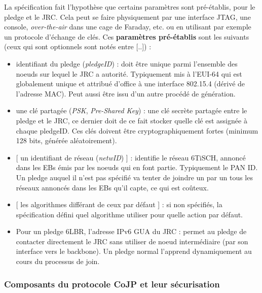 \documentclass[]{report}
\begin{document}
La spécification \cite{ietf-6tisch-minimal-security-15} fait l'hypothèse que certains paramètres sont pré-établis, pour le pledge et le JRC. Cela peut se faire physiquement par une interface JTAG, une console, \textit{over-the-air} dans une cage de Faraday, etc. ou en utilisant par exemple un protocole d'échange de clés. Ces \textbf{paramètres pré-établis} sont les suivants (ceux qui sont optionnels sont notés entre [..]) :
\vspace{0.2cm}
\begin{itemize}[label=$\bullet$]
\item identifiant du pledge (\textit{pledgeID}) : doit être unique parmi l'ensemble des noeuds sur lequel le JRC a autorité. Typiquement mis à l'EUI-64 qui est globalement unique et attribué d'office à une interface 802.15.4 (dérivé de l'adresse MAC). Peut aussi être issu d'un autre procédé de génération.
\vspace{0.2cm}
\item une clé partagée (\textit{PSK}, \textit{Pre-Shared Key}) : une clé secrète partagée entre le pledge et le JRC, ce dernier doit de ce fait stocker quelle clé est assignée à chaque pledgeID. Ces clés doivent être cryptographiquement fortes (minimum 128 bits, générée aléatoirement).
\vspace{0.2cm}
\item {[} un identifiant de réseau (\textit{netwID}) ] : identifie le réseau 6TiSCH, annoncé dans les EBs émis par les noeuds qui en font partie. Typiquement le PAN ID. Un pledge auquel il n'est pas spécifié va tenter de joindre un par un tous les réseaux annoncés dans les EBs qu'il capte, ce qui est coûteux.
\vspace{0.2cm}
\item {[} les algorithmes différant de ceux par défaut ] : si non spécifiés, la spécification \cite{ietf-6tisch-minimal-security-15} défini quel algorithme utiliser pour quelle action par défaut.
\vspace{0.2cm}
\item Pour un pledge 6LBR, l'adresse IPv6 GUA du JRC : permet au pledge de contacter directement le JRC sans utiliser de noeud intermédiaire (par son interface vers le backbone). Un pledge normal l'apprend dynamiquement au cours du processus de join.
\end{itemize}

\newpage

\subsubsection{Composants du protocole CoJP et leur sécurisation}
\end{document}
